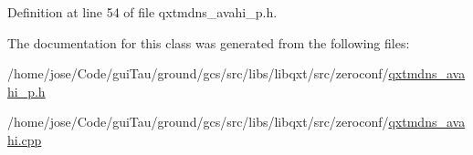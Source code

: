 Definition at line 54 of file qxtmdns\-\_\-avahi\-\_\-p.\-h.



The documentation for this class was generated from the following files\-:\begin{DoxyCompactItemize}
\item 
/home/jose/\-Code/gui\-Tau/ground/gcs/src/libs/libqxt/src/zeroconf/\hyperlink{qxtmdns__avahi__p_8h}{qxtmdns\-\_\-avahi\-\_\-p.\-h}\item 
/home/jose/\-Code/gui\-Tau/ground/gcs/src/libs/libqxt/src/zeroconf/\hyperlink{qxtmdns__avahi_8cpp}{qxtmdns\-\_\-avahi.\-cpp}\end{DoxyCompactItemize}
